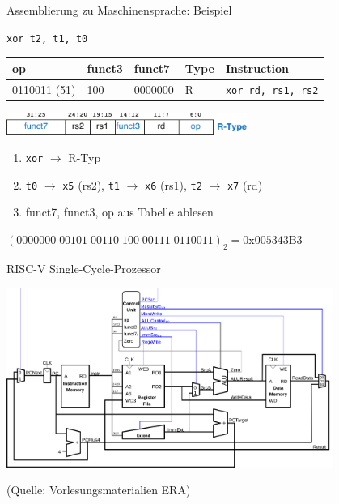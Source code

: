 \documentclass[
  german,            %
  aspectratio=169,    %
]{tumbeamer}
\begin{document}
\begin{frame}[c, fragile]{Assemblierung zu Maschinensprache: Beispiel}{}
	\begin{center}
		\large\texttt{xor t2, t1, t0}\\
		\scriptsize
		\begin{table}[]
			\begin{tabular}{|l|l|l|l|l|}
				\hline
				\rowcolor[HTML]{0078C3}
				{\color{white}\textbf{op}} & {\color{white}\textbf{funct3}} & {\color{white}\textbf{funct7}} & {\color{white}\textbf{Type}} & {\color{white}\textbf{Instruction}} \\ \hline
				0110011 (51)               & 100                            & 0000000                        & R                            & \texttt{xor rd, rs1, rs2}           \\ \hline
			\end{tabular}
		\end{table}

		\includegraphics[width=0.59\textwidth]{w08_r_type.pdf}
	\end{center}

	\begin{enumerate}
		\item \texttt{xor} $\rightarrow$ R-Typ
		\item \texttt{t0} $\rightarrow$ \texttt{x5} (rs2), \texttt{t1} $\rightarrow$ \texttt{x6} (rs1), \texttt{t2} $\rightarrow$ \texttt{x7} (rd)
		\item funct7, funct3, op aus Tabelle ablesen
	\end{enumerate}
	\begin{center}
		\Large
		$(0000000\;00101\;00110\;100\;00111\;0110011)_2 = \textrm{0x005343B3}$
	\end{center}

\end{frame}


\begin{frame}[c]{RISC-V Single-Cycle-Prozessor}{}
	\begin{center}
		\includegraphics[width=0.8\textwidth]{w08_single_cycle.png}
	\end{center}
	\centering
	\tiny (Quelle: Vorlesungsmaterialien ERA)
\end{frame}
\end{document}
